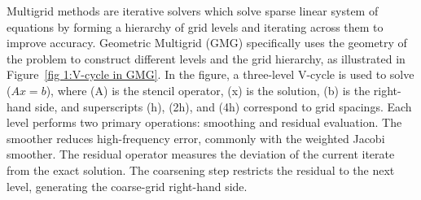 \documentclass[conference]{IEEEtran}
\begin{document}
            Multigrid methods are iterative solvers which solve sparse linear system of equations by forming a hierarchy of grid levels and iterating across them to %
            improve accuracy.  %
            Geometric Multigrid (GMG) specifically uses the geometry of the problem to construct different levels and the grid hierarchy, as illustrated in Figure~\ref{fig 1:V-cycle in GMG}.
            In the figure,
            a three-level V-cycle is used to solve (\(Ax = b\)), where (A) is the stencil operator, (x) is the solution, (b) is the right-hand side, and superscripts (h), (2h), and (4h) correspond to grid spacings. Each level performs two primary operations: smoothing and residual evaluation. The smoother reduces high-frequency error, commonly with %
            the weighted Jacobi smoother. %
            The residual operator %
            measures the deviation of the current iterate from the exact solution. The coarsening step restricts the residual to the next level, generating the coarse-grid right-hand side. %
\end{document}
